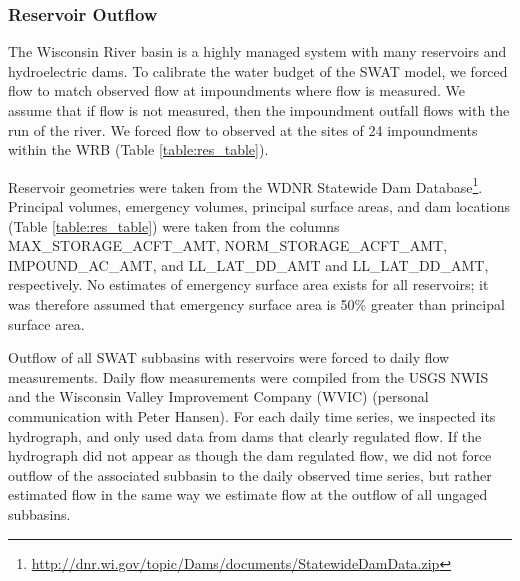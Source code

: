 \subsubsection{Reservoir Outflow}\label{sec:reservoirs}

The Wisconsin River basin is a highly managed system with many reservoirs and hydroelectric dams. To calibrate the water budget of the SWAT model, we forced flow to match observed flow at impoundments where flow is measured. We assume that if flow is not measured, then the impoundment outfall flows with the run of the river. We forced flow to observed at the sites of 24 impoundments within the WRB (Table \ref{table:res_table}).

Reservoir geometries were taken from the WDNR Statewide Dam Database\footnote{\url{http://dnr.wi.gov/topic/Dams/documents/StatewideDamData.zip}}. Principal volumes, emergency volumes, principal surface areas, and dam locations (Table \ref{table:res_table}) were taken from the columns MAX\_STORAGE\_ACFT\_AMT, NORM\_STORAGE\_ACFT\_AMT, IMPOUND\_AC\_AMT, and LL\_LAT\_DD\_AMT and LL\_LAT\_DD\_AMT, respectively. No estimates of emergency surface area exists for all reservoirs; it was therefore assumed that emergency surface area is 50\% greater than principal surface area.

Outflow of all SWAT subbasins with reservoirs were forced to daily flow measurements. Daily flow measurements were compiled from the USGS NWIS \citep{usgs_nwis_2014} and the Wisconsin Valley Improvement Company (WVIC) (personal communication with Peter Hansen). For each daily time series, we inspected its hydrograph, and only used data from dams that clearly regulated flow. If the hydrograph did not appear as though the dam regulated flow, we did not force outflow of the associated subbasin to the daily observed time series, but rather estimated flow in the same way we estimate flow at the outflow of all ungaged subbasins. 
